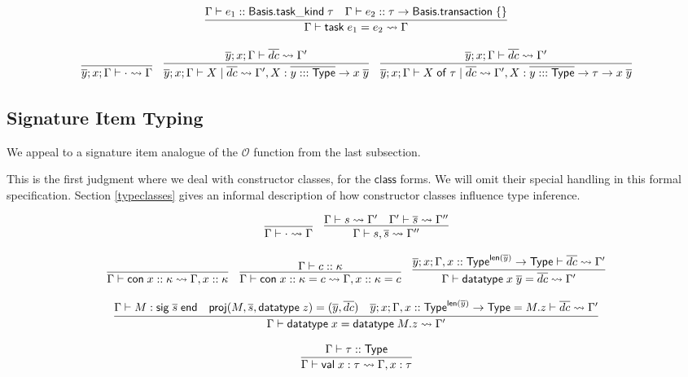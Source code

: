 \documentclass{article}
\newcommand{\mt}[1]{\mathsf{#1}}
\begin{document}
$$\infer{\Gamma \vdash \mt{task} \; e_1 = e_2 \leadsto \Gamma}{
  \Gamma \vdash e_1 :: \mt{Basis}.\mt{task\_kind} \; \tau
  & \Gamma \vdash e_2 :: \tau \to \mt{Basis}.\mt{transaction} \; \{\}
}$$

$$\infer{\overline{y}; x; \Gamma \vdash \cdot \leadsto \Gamma}{}
\quad \infer{\overline{y}; x; \Gamma \vdash X \mid \overline{dc} \leadsto \Gamma', X : \overline{y ::: \mt{Type}} \to x \; \overline{y}}{
  \overline{y}; x; \Gamma \vdash \overline{dc} \leadsto \Gamma'
}
\quad \infer{\overline{y}; x; \Gamma \vdash X \; \mt{of} \; \tau \mid \overline{dc} \leadsto \Gamma', X : \overline{y ::: \mt{Type}} \to \tau \to x \; \overline{y}}{
  \overline{y}; x; \Gamma \vdash \overline{dc} \leadsto \Gamma'
}$$

\subsection{Signature Item Typing}

We appeal to a signature item analogue of the $\mathcal O$ function from the last subsection.

This is the first judgment where we deal with constructor classes, for the $\mt{class}$ forms.  We will omit their special handling in this formal specification.  Section \ref{typeclasses} gives an informal description of how constructor classes influence type inference.

$$\infer{\Gamma \vdash \cdot \leadsto \Gamma}{}
\quad \infer{\Gamma \vdash s, \overline{s} \leadsto \Gamma''}{
  \Gamma \vdash s \leadsto \Gamma'
  & \Gamma' \vdash \overline{s} \leadsto \Gamma''
}$$

$$\infer{\Gamma \vdash \mt{con} \; x :: \kappa \leadsto \Gamma, x :: \kappa}{}
\quad \infer{\Gamma \vdash \mt{con} \; x :: \kappa = c \leadsto \Gamma, x :: \kappa = c}{
  \Gamma \vdash c :: \kappa
}
\quad \infer{\Gamma \vdash \mt{datatype} \; x \; \overline{y} = \overline{dc} \leadsto \Gamma'}{
  \overline{y}; x; \Gamma, x :: \mt{Type}^{\mt{len}(\overline y)} \to \mt{Type} \vdash \overline{dc} \leadsto \Gamma'
}$$

$$\infer{\Gamma \vdash \mt{datatype} \; x = \mt{datatype} \; M.z \leadsto \Gamma'}{
  \Gamma \vdash M : \mt{sig} \; \overline{s} \; \mt{end}
  & \mt{proj}(M, \overline{s}, \mt{datatype} \; z) = (\overline{y}, \overline{dc})
  & \overline{y}; x; \Gamma, x :: \mt{Type}^{\mt{len}(\overline y)} \to \mt{Type} = M.z \vdash \overline{dc} \leadsto \Gamma'
}$$

$$\infer{\Gamma \vdash \mt{val} \; x : \tau \leadsto \Gamma, x : \tau}{
  \Gamma \vdash \tau :: \mt{Type}
}$$
\end{document}
